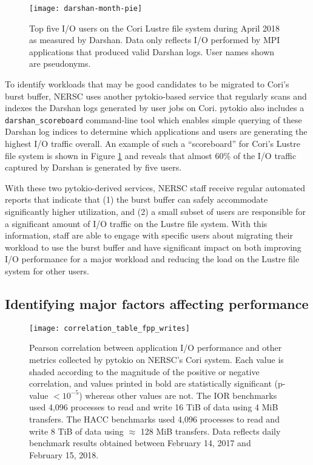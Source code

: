 \begin{figure}
    \centering
    \texttt{[image: darshan-month-pie]}
    \vspace{-.2in}
    \caption{%
    Top five I/O users on the Cori Lustre file system during April 2018 as measured by Darshan.
    Data only reflects I/O performed by MPI applications that produced valid Darshan logs.
    User names shown are pseudonyms.
    }
    \label{fig:darshan-month-pie}
    \vspace{-.2in}
\end{figure}

To identify workloads that may be good candidates to be migrated to Cori's burst buffer, NERSC uses another pytokio-based service that regularly scans and indexes the Darshan logs generated by user jobs on Cori.
pytokio also includes a \texttt{darshan\_scoreboard} command-line tool which enables simple querying of these Darshan log indices to determine which applications and users are generating the highest I/O traffic overall.
An example of such a ``scoreboard'' for Cori's Lustre file system is shown in Figure \ref{fig:darshan-month-pie} and reveals that almost 60\% of the I/O traffic captured by Darshan is generated by five users.

With these two pytokio-derived services, NERSC staff receive regular automated reports that indicate that (1) the burst buffer can safely accommodate significantly higher utilization, and (2) a small subset of users are responsible for a significant amount of I/O traffic on the Lustre file system.
With this information, staff are able to engage with specific users about migrating their workload to use the burst buffer and have significant impact on both improving I/O performance for a major workload and reducing the load on the Lustre file system for other users.

\subsection{Identifying major factors affecting performance} \label{sec:results/fs-behavior}

\begin{figure*}
    \centering
    \texttt{[image: correlation\_table\_fpp\_writes]}
    \caption{Pearson correlation between application I/O performance and other metrics collected by pytokio on NERSC's Cori system.
    Each value is shaded according to the magnitude of the positive or negative correlation, and values printed in bold are statistically significant (p-value $ < 10^{-5}$) whereas other values are not.
    The IOR benchmarks used 4,096 processes to read and write 16 TiB of data using 4 MiB transfers.
    The HACC benchmarks used 4,096 processes to read and write 8 TiB of data using $\approx$ 128 MiB transfers.
    Data reflects daily benchmark results obtained between February 14, 2017 and February 15, 2018.
    }
    \label{fig:correlation-table}
    \vspace{-.2in}
\end{figure*}

